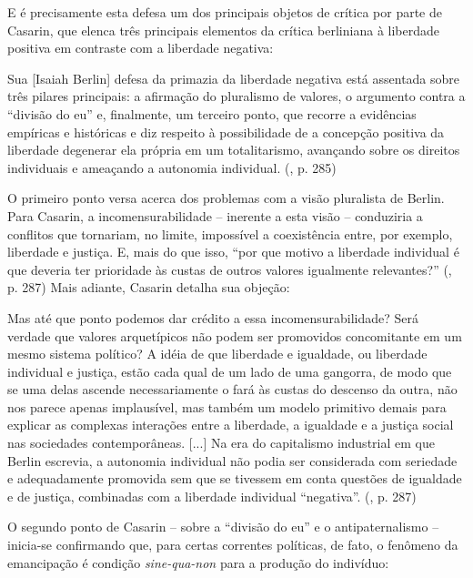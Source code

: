 \documentclass[12pt,a4paper]{article}
\newenvironment{citac}
{
	
	\par\setlength{\leftskip}{4cm}\noindent\ignorespaces
	\footnotesize}{\normalfont
	\par

}
\begin{document}
	E é precisamente esta defesa um dos principais objetos de crítica 
	por parte de Casarin, que elenca três principais elementos da 
	crítica berliniana à liberdade positiva em contraste com a liberdade 
	negativa: 

	\begin{citac}
		Sua [Isaiah Berlin] defesa da primazia da liberdade negativa
		está assentada sobre três pilares principais: a afirmação 
		do pluralismo de valores, o argumento contra a “divisão do 
		eu” e, finalmente, um terceiro ponto, que recorre a 
		evidências empíricas e históricas e diz respeito à 
		possibilidade de a concepção positiva da liberdade degenerar 
		ela própria em um totalitarismo, avançando sobre os direitos 
		individuais e ameaçando a autonomia individual. 
		(\cite{casarin}, p. 285)
	\end{citac}

	O primeiro ponto versa acerca dos problemas com a visão pluralista de 
	Berlin. Para Casarin, a incomensurabilidade -- inerente a esta visão --
	conduziria a conflitos que tornariam, no limite, impossível a 
	coexistência entre, por exemplo, liberdade e justiça. E, mais do que 
	isso, “por que motivo a liberdade individual é que deveria ter 
	prioridade às custas de outros valores igualmente relevantes?” 
	(\cite{casarin}, p. 287) Mais adiante, Casarin detalha sua objeção: 

	\begin{citac}
		Mas até que ponto podemos dar crédito a essa
		incomensurabilidade? Será verdade que valores
		arquetípicos não podem ser promovidos
		concomitante em um mesmo sistema político? A
		idéia de que liberdade e igualdade, ou liberdade
		individual e justiça, estão cada qual de um lado de
		uma gangorra, de modo que se uma delas ascende 
		necessariamente o fará às custas do descenso
		da outra, não nos parece apenas implausível, mas
		também um modelo primitivo demais para explicar 
		as complexas interações entre a liberdade, a 
		igualdade e a justiça social nas sociedades contemporâneas. 
		[...]
		Na era do capitalismo industrial em que Berlin escrevia, a
		autonomia individual não podia ser considerada 
		com seriedade e adequadamente promovida sem
		que se tivessem em conta questões de igualdade e
		de justiça, combinadas com a liberdade individual “negativa”.
		(\cite{casarin}, p. 287)
	\end{citac}
	
	O segundo ponto de Casarin -- sobre a “divisão do eu” e o 
	antipaternalismo -- inicia-se confirmando que, para certas correntes 
	políticas, de fato, o fenômeno da emancipação é condição 
	\textit{sine-qua-non} para a produção do indivíduo: 
\end{document}
